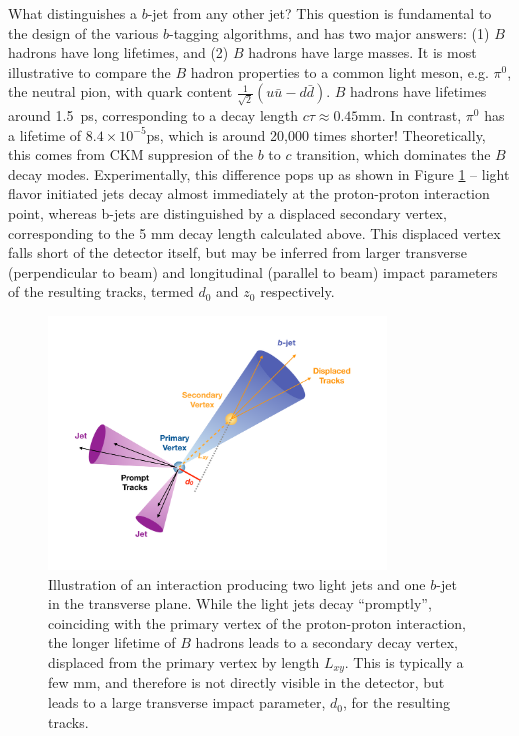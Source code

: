 What distinguishes a $b$-jet from any other jet? This question is fundamental to the design of the various $b$-tagging 
algorithms, and has two major answers: (1) $B$ hadrons have long lifetimes, and (2) $B$ hadrons have large masses. 
It is most illustrative to compare the $B$ hadron properties to a common light meson, e.g. $\pi^{0}$, the neutral 
pion, with quark content $\frac{1}{\sqrt{2}}(u\bar{u}-d\bar{d})$. $B$ hadrons have lifetimes around \SI{1.5}{\ps},
corresponding to a decay length $c\tau\approx 0.45$mm. In contrast, $\pi^0$ has a lifetime of $8.4\times 10^{-5}$ps, 
which is around 20,000 times shorter! Theoretically, this comes from CKM suppresion of the $b$ to $c$ transition, which dominates the $B$ decay modes. Experimentally, this difference pops up as shown in 
Figure \ref{fig:bjet-diagram} -- light flavor initiated jets decay almost immediately at the proton-proton 
interaction point, whereas b-jets are distinguished by a displaced secondary vertex, corresponding to the 5 mm decay 
length calculated above. This displaced vertex falls short of the detector itself, but may be inferred from larger 
transverse (perpendicular to beam) and longitudinal (parallel to beam) impact parameters of the resulting tracks, 
termed $d_{0}$ and $z_{0}$ respectively.

\begin{figure}[ht]
\centering
\includegraphics[width=0.8\textwidth]{figures/bjet-diagram.pdf}
\caption{\label{fig:bjet-diagram} Illustration of an interaction producing two light jets and one $b$-jet 
in the transverse plane. While the light jets decay ``promptly'', coinciding with the primary vertex of the 
proton-proton interaction, the longer lifetime of $B$ hadrons leads to a secondary decay vertex, displaced from 
the primary vertex by length $L_{xy}$. This is typically a few mm, and therefore is not directly visible in the 
detector, but leads to a large transverse impact parameter, $d_{0}$, for the resulting tracks.~\cite{bjettrigger}}
\end{figure}

